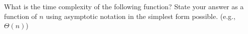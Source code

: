 \begin{prob}
    What is the time complexity of the following function? 
    State your answer as a function of $n$ using asymptotic notation in 
    the simplest form possible. (e.g., $\Theta(n)$)

    \inputminted[lastline=8]{python}{code.py}


\end{prob}
